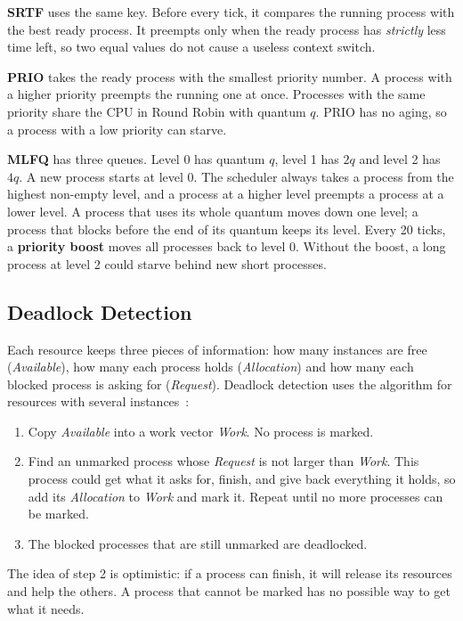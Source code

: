 \textbf{SRTF} uses the same key. Before every tick, it compares the running process with the best ready process. It preempts only when the ready process has \emph{strictly} less time left, so two equal values do not cause a useless context switch.

\textbf{PRIO} takes the ready process with the smallest priority number. A process with a higher priority preempts the running one at once. Processes with the same priority share the CPU in Round Robin with quantum $q$. PRIO has no aging, so a process with a low priority can starve.

\textbf{MLFQ} has three queues. Level 0 has quantum $q$, level 1 has $2q$ and level 2 has $4q$. A new process starts at level 0. The scheduler always takes a process from the highest non-empty level, and a process at a higher level preempts a process at a lower level. A process that uses its whole quantum moves down one level; a process that blocks before the end of its quantum keeps its level. Every 20 ticks, a \textbf{priority boost} moves all processes back to level 0. Without the boost, a long process at level 2 could starve behind new short processes.

\subsection{Deadlock Detection}
Each resource keeps three pieces of information: how many instances are free (\textit{Available}), how many each process holds (\textit{Allocation}) and how many each blocked process is asking for (\textit{Request}). Deadlock detection uses the algorithm for resources with several instances~\cite[Sec.~8.6.2]{silberschatz}:
\begin{enumerate}
    \item Copy \textit{Available} into a work vector \textit{Work}. No process is marked.
    \item Find an unmarked process whose \textit{Request} is not larger than \textit{Work}. This process could get what it asks for, finish, and give back everything it holds, so add its \textit{Allocation} to \textit{Work} and mark it. Repeat until no more processes can be marked.
    \item The blocked processes that are still unmarked are deadlocked.
\end{enumerate}
The idea of step 2 is optimistic: if a process can finish, it will release its resources and help the others. A process that cannot be marked has no possible way to get what it needs.

